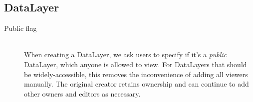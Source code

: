 \subsection{DataLayer}
\begin{description}
\item[Public flag] \hfill \\
When creating a DataLayer, we ask users to specify if it's a \textit{public} DataLayer, which anyone is allowed to view. For DataLayers that should be widely-accessible, this removes the inconvenience of adding all viewers manually. The original creator retains ownership and can continue to add other owners and editors as necessary.
\end{description}














\label{design_srid}
